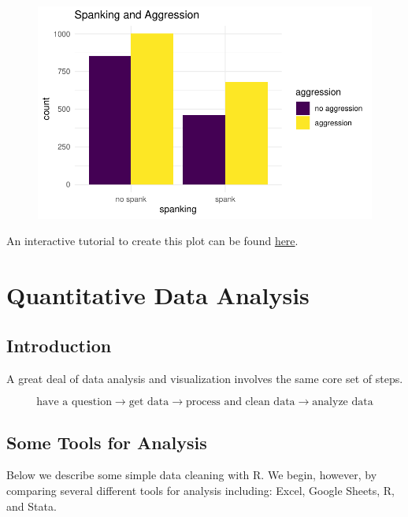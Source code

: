\documentclass[
  letterpaper,
  DIV=11,
  numbers=noendperiod]{scrreprt}
\begin{document}
\begin{figure}[H]

{\centering \includegraphics{quick-intro-ggplot2_files/figure-pdf/unnamed-chunk-8-1.pdf}

}

\end{figure}

An interactive tutorial to create this plot can be found
\href{https://agrogan1.github.io/globalfamilies-flipbook/}{here}.


\hypertarget{quantitative-data-analysis}{%
\chapter{Quantitative Data Analysis}\label{quantitative-data-analysis}}

\hypertarget{introduction}{%
\section{Introduction}\label{introduction}}

A great deal of data analysis and visualization involves the same core
set of steps.

\[\text{have a question} \rightarrow \text{get data} \rightarrow \text{process and clean data} \rightarrow \text{analyze data}\]

\hypertarget{some-tools-for-analysis}{%
\section{Some Tools for Analysis}\label{some-tools-for-analysis}}

Below we describe some simple data cleaning with R. We begin, however,
by comparing several different tools for analysis including: Excel,
Google Sheets, R, and Stata.
\end{document}
